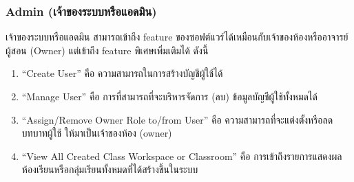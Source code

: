 \documentclass[12pt,oneside,openright,a4paper]{cpe-thai-project}
\begin{document}
        \subsubsection{Admin (เจ้าของระบบหรือแอดมิน)}
        เจ้าของระบบหรือแอดมิน สามารถเข้าถึง feature ของซอฟต์แวร์ได้เหมือนกับเจ้าของห้องหรืออาจารย์ผู้สอน (Owner) แต่เข้าถึง feature พิเศษเพิ่มเติมได้ ดังนี้
        \begin{enumerate}
            \item “Create User” คือ ความสามารถในการสร้างบัญชีผู้ใช้ได้
            \item “Manage User” คือ การที่สามารถที่จะบริหารจัดการ (ลบ) ข้อมูลบัญชีผู้ใช้ทั้งหมดได้
            \item “Assign/Remove Owner Role to/from User” คือ ความสามารถที่จะแต่งตั้งหรือลดบทบาทผู้ใช้ ให้มาเป็นเจ้าของห้อง (owner)
            \item “View All Created Class Workspace or Classroom” คือ การเข้าถึงรายการแสดงผลห้องเรียนหรือกลุ่มเรียนทั้งหมดที่ได้สร้างขึ้นในระบบ
        \end{enumerate}
    \pagebreak
    
\end{document}
